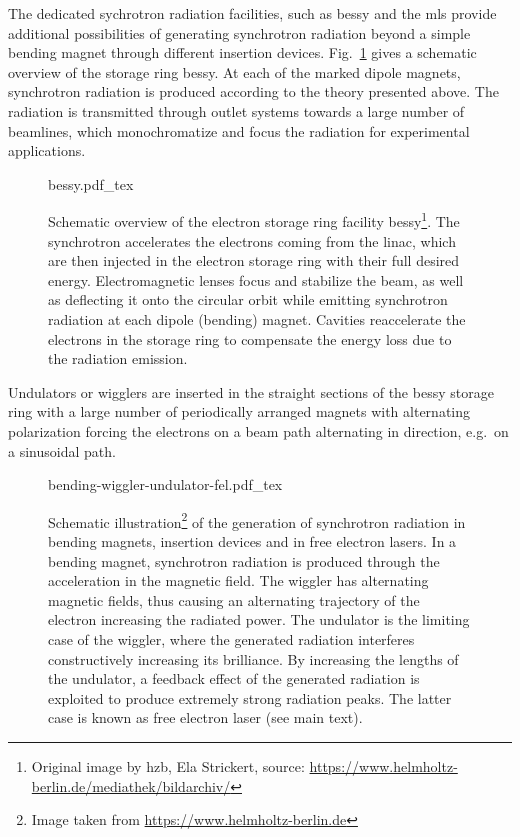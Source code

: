 The dedicated sychrotron radiation facilities, such as \gls{bessy} and the \gls{mls} provide additional possibilities of generating synchrotron radiation beyond a simple bending magnet through different insertion devices. Fig.~\ref{ch_exp:fig_bessy2} gives a schematic overview of the storage ring \gls{bessy}. At each of the marked dipole magnets, synchrotron radiation is produced according to the theory presented above. The radiation is transmitted through outlet systems towards a large number of beamlines, which monochromatize and focus the radiation for experimental applications.
\begin{figure}[htb]
    \def\svgwidth{0.7\textwidth}
    {bessy.pdf_tex}
    \caption[Schematic overview of BESSY II.]{Schematic overview of the electron storage ring facility \gls{bessy}\footnote{Original image by \gls{hzb}, Ela Strickert, source: \url{https://www.helmholtz-berlin.de/mediathek/bildarchiv/}}. The synchrotron accelerates the electrons coming from the \gls{linac}, which are then injected in the electron storage ring with their full desired energy. Electromagnetic lenses focus and stabilize the beam, as well as deflecting it onto the circular orbit while emitting synchrotron radiation at each dipole (bending) magnet. Cavities reaccelerate the electrons in the storage ring to compensate the energy loss due to the radiation emission.}
    \label{ch_exp:fig_bessy2}
\end{figure}
Undulators or wigglers are inserted in the straight sections of the \gls{bessy} storage ring with a large number of periodically arranged magnets with alternating polarization forcing the electrons on a beam path alternating in direction, e.g.~on a sinusoidal path.
\begin{figure}[htb]
    \def\svgwidth{0.7\textwidth}
    {bending-wiggler-undulator-fel.pdf_tex}
    \caption[Schematic principle of insertion devices.]{Schematic illustration\footnote{Image taken from \url{https://www.helmholtz-berlin.de}} of the generation of synchrotron radiation in bending magnets, insertion devices and in free electron lasers. In a bending magnet, synchrotron radiation is produced through the acceleration in the magnetic field. The wiggler has alternating magnetic fields, thus causing an alternating trajectory of the electron increasing the radiated power. The undulator is the limiting case of the wiggler, where the generated radiation interferes constructively increasing its brilliance. By increasing the lengths of the undulator, a feedback effect of the generated radiation is exploited to produce extremely strong radiation peaks. The latter case is known as free electron laser (see main text).}
    \label{ch_exp:fig_bending-wiggler-undulator-fel}
\end{figure}

